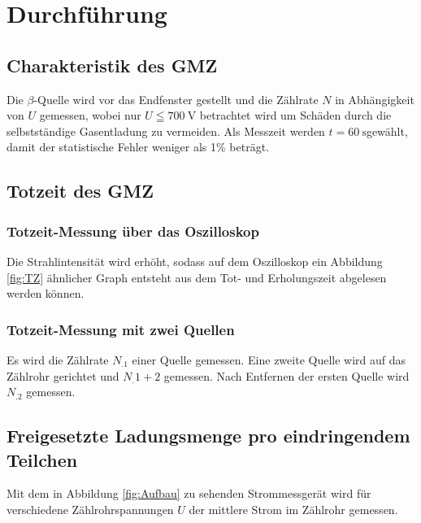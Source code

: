 \section{Durchführung}
\label{sec:Durchführung}

\subsection{Charakteristik des GMZ}
Die $\beta$-Quelle wird vor das Endfenster gestellt und die Zählrate $N$ in Abhängigkeit von $U$ gemessen, wobei nur $U\leqq \SI{700}{\volt}$ betrachtet wird um Schäden durch die selbstständige Gasentladung zu vermeiden. Als Messzeit werden $t=\SI{60}{\second}$gewählt, damit der statistische Fehler weniger als 1\% beträgt.


\subsection{Totzeit des GMZ}
\subsubsection{Totzeit-Messung über das Oszilloskop}
\noindent Die Strahlintensität wird erhöht, sodass auf dem Oszilloskop ein Abbildung \ref{fig:TZ} ähnlicher Graph entsteht aus dem Tot- und Erholungszeit abgelesen werden können.
\subsubsection{Totzeit-Messung mit zwei Quellen}
Es wird die Zählrate $N_.1$ einer Quelle gemessen.
Eine zweite Quelle wird auf das Zählrohr gerichtet und $N_.{1+2}$ gemessen.
Nach Entfernen der ersten Quelle wird $N_.2$ gemessen.
\subsection{Freigesetzte Ladungsmenge pro eindringendem Teilchen}
Mit dem in Abbildung \ref{fig:Aufbau} zu sehenden Strommessgerät wird für verschiedene Zählrohrspannungen $U$ der mittlere Strom im Zählrohr gemessen.